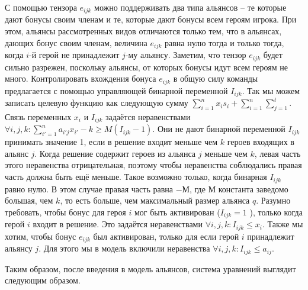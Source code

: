 \documentclass{article}
\begin{document}
С помощью тензора $e_{ijk}$ можно поддерживать два типа альянсов – те которые дают бонусы своим членам и те, которые дают бонусы всем героям игрока. При этом, альянсы рассмотренных видов отличаются только тем, что в альянсах, дающих бонус своим членам, величина $e_{ijk}$ равна нулю тогда и только тогда, когда $i$-й герой не принадлежит $j$-му альянсу. Заметим, что тензор  $e_{ijk}$  будет сильно разрежен, поскольку альянсы, от которых бонусы идут всем героям не много.  
Контролировать вхождения бонуса $e_{ijk}$ в общую силу команды предлагается с помощью управляющей бинарной переменной $I_{ijk}$.
Так мы можем записать целевую функцию как следующую сумму $\sum_{i=1}^{n} x_i s_i + \sum_{i=1}^{n} \sum_{j=1}^{t} $.
Связь переменных $x_{i}$ и $I_{ijk}$ задаётся неравенствами
$\forall{i,j,k} :  \sum_{i'=1}^{n} a_{i'j} x_{i'} - k \ge M( I_{ijk}  - 1)$. 
Они не дают бинарной переменной $I_{ijk}$ принимать значение 1, если в решение входит меньше чем $k$ героев входящих в альянс $j$. Когда решение содержит героев из альянса $j$ меньше чем $k$, левая часть этого неравенства отрицательная, поэтому чтобы неравенства соблюдались правая часть должна быть ещё меньше. Такое возможно только, когда бинарная $I_{ijk}$ равно нулю. В этом случае правая часть равна $-М$, где $М$ константа заведомо большая, чем $k$, то есть больше, чем максимальный размер альянса $q$.
Разумно требовать, чтобы бонус для героя $i$ мог быть активирован ($I_{ijk} = 1$ ), только когда герой $i$ входит в решение. Это задаётся неравенствами $\forall{i,j,k} :  I_{ijk}  \le x_i$. Также мы хотим, чтобы бонус $e_{ijk}$ был активирован, только для если герой $i$ принадлежит альянсу $j$. Для этого мы в модель включили неравенства $\forall{i,j,k} :  I_{ijk}  \le a_{ij}$.   

Таким образом, после введения в модель альянсов, система уравнений выглядит следующим образом.
\end{document}
